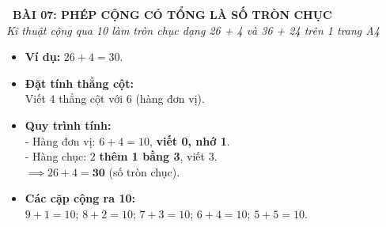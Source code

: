 \documentclass[11pt,a4paper]{article}
\begin{document}
\begin{tcolorbox}[
  enhanced,
  colback=violet!8!white,
  colframe=violet!70!black,
  arc=3mm, boxrule=1.2pt,
  left=3mm, right=3mm, top=2mm, bottom=2mm,
  halign=center
]
  {\LARGE\bfseries\color{violet!90!black}\faBookmark\ BÀI 07: PHÉP CỘNG CÓ TỔNG LÀ SỐ TRÒN CHỤC}\\[1mm]
  {\itshape\footnotesize\color{black!75} Kĩ thuật cộng qua 10 làm tròn chục dạng 26 + 4 và 36 + 24 trên 1 trang A4}
\end{tcolorbox}

\vspace{-2mm}

\noindent
\begin{minipage}[t]{0.49\textwidth}\vspace{0pt}
\begin{tcolorbox}[
  enhanced,
  colback=violet!4!white,
  colframe=violet!75!black,
  arc=2mm, boxrule=0.8pt,
  left=2mm, right=2mm, top=1.8mm, bottom=1.8mm,
  title={\footnotesize\bfseries\color{white}\faKey\ 1. Dạng 1: Số có 2 chữ số cộng số có 1 chữ số}
]
{\footnotesize
\begin{itemize}\setlength{\itemsep}{1pt}\setlength{\leftskip}{-2.5mm}
  \item \textbf{Ví dụ:} $26 + 4 = 30$.
  \item \textbf{Đặt tính thẳng cột:}\\
  Viết $4$ thẳng cột với $6$ (hàng đơn vị).
  \item \textbf{Quy trình tính:}\\
  - Hàng đơn vị: $6 + 4 = 10$, \textbf{viết 0, nhớ 1}.\\
  - Hàng chục: $2$ \textbf{thêm 1 bằng 3}, viết $3$.\\
  $\implies 26 + 4 = \mathbf{30}$ (số tròn chục).
  \item \textbf{Các cặp cộng ra 10:}\\
  $9+1=10$; $8+2=10$; $7+3=10$; $6+4=10$; $5+5=10$.
\end{itemize}
}
\end{tcolorbox}
\end{minipage}
\hfill
\end{document}
